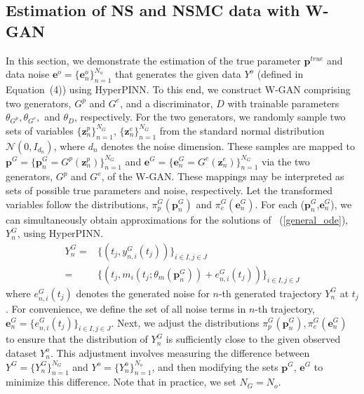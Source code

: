 \documentclass[letterpaper]{article} %
\theoremstyle{thmstyleone}%
\theoremstyle{thmstyletwo}%
\theoremstyle{thmstylethree}%
\begin{document}
\subsection{Estimation of NS and NSMC data with W-GAN}
In this section, we demonstrate the estimation of the true parameter $\mathbf{p}^{true}$ and data noise $\mathbf{e}^{o}=\{\mathbf{e}_{n}^{o}\}_{n=1}^{N_{o}}$ that generates the given data $Y^{o}$ (defined in Equation~(4)) using HyperPINN. To this end, we construct W-GAN comprising two generators, $G^p$ and $G^e$, and a discriminator, $D$ with trainable parameters $\theta_{G^p}, \theta_{G^e},$ and $\theta_{D}$, respectively. For the two generators, we randomly sample two sets of variables $\{ \mathbf{z}^{p}_{n} \}_{n=1}^{N_{G}}$, $\{\mathbf{z}^{e}_{n} \}_{n=1}^{N_{G}}$ from the standard normal distribution $\mathcal{N}(0,I_{d_{n}})$, where $d_{n}$ denotes the noise dimension. These samples are mapped to $\mathbf{p}^{G}=\{\mathbf{p}_{n}^{G}=G^p(\mathbf{z}_{n}^{p})\}_{n=1}^{N_{G}}$ and $\mathbf{e}^{G}=\{\mathbf{e}_{n}^{G}=G^{e}(\mathbf{z}_{n}^{e})\}_{n=1}^{N_{G}}$ via the two generators, $G^p$ and $G^e$, of the W-GAN. These mappings may be interpreted as sets of possible true parameters and noise, respectively. Let the transformed variables follow the distributions, $\pi_{p}^{G}(\mathbf{p}_{n}^{G})$ and $\pi_{e}^{G}(\mathbf{e}_{n}^{G})$. For each ($\mathbf{p}_{n}^{G}$,$\mathbf{e}_{n}^{G}$), we can simultaneously obtain approximations for the solutions of ~(\cref{general_ode}), $Y_{n}^{G}$, using HyperPINN.\begin{eqnarray*}
    Y_{n}^{G}=& \{(t_{j},y_{n,i}^{G}(t_{j}))\}_{i \in I, j \in J} \nonumber\\
    =& \{(t_{j}, m_{i}(t_{j};\theta_{m}(\mathbf{p}_{n}^{G}))+e_{n,i}^{G}(t_{j}))\}_{i \in I, j \in J}
\end{eqnarray*}
where $e_{n,i}^{G}(t_{j})$ denotes the generated noise for $n$-th generated trajectory $Y_{n}^{G}$ at $t_{j}$. For convenience, we define the set of all noise terms in $n$-th trajectory, $\mathbf{e}_{n}^{G}=\{e_{n,i}^{G}(t_{j})\}_{i\in I, j\in J}$. Next, we adjust the distributions $\pi_{p}^{G}(\mathbf{p}_{n}^{G}), \pi_{e}^{G}(\mathbf{e}_{n}^{G})$ to ensure that the distribution of $Y_{n}^{G}$ is sufficiently close to the given observed dataset $Y_{n}^{o}$. This adjustment involves measuring the difference between $Y^{G}=\{Y_{n}^{G}\}_{n=1}^{N_{G}}$ and $Y^{o}=\{Y_{n}^{o}\}_{n=1}^{N_{o}}$, and then modifying the sets $\mathbf{p}^{G}$, $\mathbf{e}^{G}$ to minimize this difference. Note that in practice, we set $N_{G}=N_{o}$.
\end{document}
